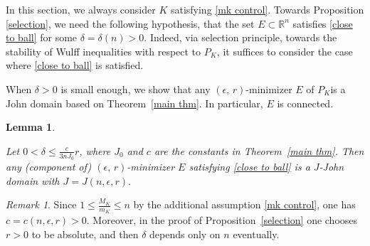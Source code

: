 \documentclass[reqno,11pt]{amsart}
\makeatletter
\def\ez{\epsilon}
\newtheorem{lem}[thm]{Lemma}%
\numberwithin{equation}{section}
\theoremstyle{remark}
\newtheorem{rem}[thm]{Remark}%
\makeatother
\begin{document}
In this section, we always consider $K$ satisfying \eqref{mk control}. 
Towards Proposition \ref{selection}, we need the following hypothesis,  that the set $E\subset\mathbb R^n$ satisfies \eqref{close to ball}
for some $\delta=\delta(n)>0$. Indeed, via selection principle, towards the stability of Wulff inequalities with respect to $P_K$, it suffices to consider the case where \eqref{close to ball} is satisfied. 


When $\delta>0$ is small enough, we show that any $(\ez,\,r)$-minimizer  $E$  of $P_K$is a John domain based on Theorem~\ref{main thm}. In particular, $E$ is connected. 

\begin{lem}\label{John minimizer}

Let  $0<\delta\le \frac{c}{3 nJ_0} r$, where $J_0$ and $c$ are the constants in  Theorem~\ref{main thm}. Then any (component of) $(\ez,\,r)$-minimizer $E$ satisfying \eqref{close to ball} is a $J$-John domain with $J=J(n, \epsilon, r).$
\end{lem}
\begin{rem}
Since $1\le \frac{M_K}{m_K}\le n$ by the additional assumption \eqref{mk control}, one has $c=c(n, \epsilon, r)>0$. Moreover, in the proof of Proposition~\ref{selection}  one chooses $r>0$ to be absolute, and then  $\delta$ depends only on $n$ eventually. 
\end{rem}
\end{document}

